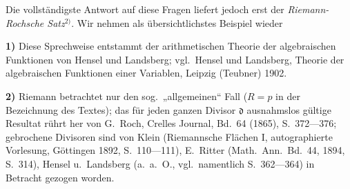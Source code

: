 \documentclass{article}
\begin{document}
Die vollständigste Antwort auf diese Fragen liefert jedoch erst der \emph{Riemann-Rochsche Satz}${}^{2)}$. Wir nehmen als übersichtlichstes Beispiel wieder

\textbf{1)} Diese Sprechweise entstammt der arithmetischen Theorie der algebraischen Funktionen von Hensel und Landsberg; vgl.\ Hensel und Landsberg, Theorie der algebraischen Funktionen einer Variablen, Leipzig (Teubner) 1902.

\textbf{2)} Riemann betrachtet nur den sog.\ „allgemeinen“ Fall ($R = p$ in der Bezeichnung des Textes); das für jeden ganzen Divisor $\mathfrak{d}$ ausnahmslos gültige Resultat rührt her von G.~Roch, Crelles Journal, Bd.~64 (1865), S.~372---376; gebrochene Divisoren sind von Klein (Riemannsche Flächen I, autographierte Vorlesung, Göttingen 1892, S.~110---111), E.~Ritter (Math.\ Ann.\ Bd.~44, 1894, S.~314), Hensel u.\ Landsberg (a.\ a.\ O., vgl.\ namentlich S.~362---364) in Betracht gezogen worden.
\end{document}
